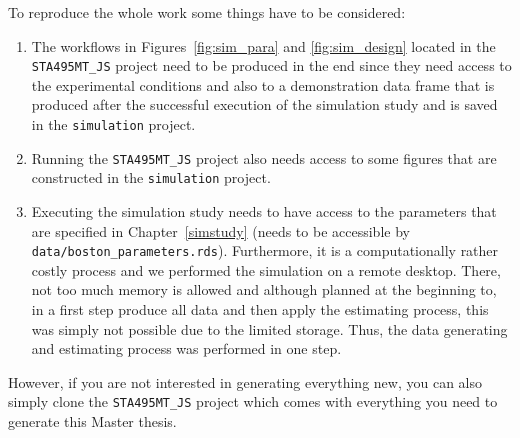 \documentclass[11pt,a4paper,twoside]{book}\usepackage[]{graphicx}\usepackage[]{xcolor}
\begin{document}
To reproduce the whole work some things have to be considered:
\begin{enumerate}
\item The workflows in Figures~\ref{fig:sim_para} and \ref{fig:sim_design} located in the \texttt{STA495MT\_JS} project need to be produced in the end since they need access to the experimental conditions and also to a demonstration data frame that is produced after the successful execution of the simulation study and is saved in the \texttt{simulation} project.
\item Running the \texttt{STA495MT\_JS} project also needs access to some figures that are constructed in the \texttt{simulation} project.
\item Executing the simulation study needs to have access to the parameters that are specified in Chapter~\ref{simstudy} (needs to be accessible by \texttt{data/boston\_parameters.rds}). Furthermore, it is a computationally rather costly process and we performed the simulation on a remote desktop. There, not too much memory is allowed and although planned at the beginning to, in a first step produce all data and then apply the estimating process, this was simply not possible due to the limited storage. Thus, the data generating and estimating process was performed in one step.
\end{enumerate}

However, if you are not interested in generating everything new, you can also simply clone the \texttt{STA495MT\_JS} project which comes with everything you need to generate this Master thesis.
\end{document}
